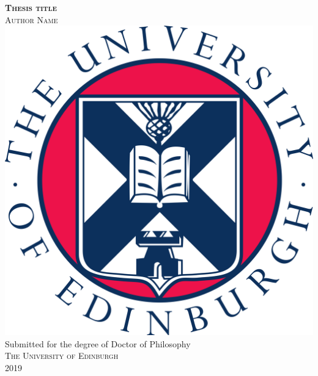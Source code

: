 \begin{titlepage}
  \vspace*{\fill}
    \begin{center}
        \Huge{\textsc{\textbf{Thesis title}}}\\[2cm]
        \Large{\textsc{Author Name}}\\[4cm]
        \includegraphics[width=0.3\linewidth]{eushieldcolour.png}\\[2cm]
        \large{Submitted for the degree of Doctor of Philosophy}\\
        \large{\textsc{The University of Edinburgh\\2019}}\\[1cm]
    \end{center}
  \vspace*{\fill}
\end{titlepage}